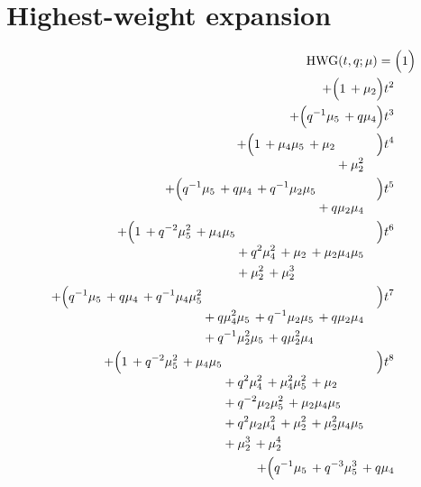 \documentclass[10pt]{article}
\begin{document}
\section{Highest-weight expansion}
\[
\begin{aligned}
\mathrm{HWG}(t,q;\mu) ={}&
   \Bigl(1\Bigr) \\
  + \Bigl(1\,+\mu_{2}\Bigr)t^{2} \\
  + \Bigl(q^{-1}\mu_{5}\,+q\mu_{4}\Bigr)t^{3} \\
  + \Bigl(\begin{aligned}[t]1\,+\mu_{4}\mu_{5}\,+\mu_{2} \\
  &{}+\mu_{2}^{2}\end{aligned}\Bigr)t^{4} \\
  + \Bigl(\begin{aligned}[t]q^{-1}\mu_{5}\,+q\mu_{4}\,+q^{-1}\mu_{2}\mu_{5} \\
  &{}+q\mu_{2}\mu_{4}\end{aligned}\Bigr)t^{5} \\
  + \Bigl(\begin{aligned}[t]1\,+q^{-2}\mu_{5}^{2}\,+\mu_{4}\mu_{5} \\
  &{}+q^{2}\mu_{4}^{2}\,+\mu_{2}\,+\mu_{2}\mu_{4}\mu_{5} \\
  &{}+\mu_{2}^{2}\,+\mu_{2}^{3}\end{aligned}\Bigr)t^{6} \\
  + \Bigl(\begin{aligned}[t]q^{-1}\mu_{5}\,+q\mu_{4}\,+q^{-1}\mu_{4}\mu_{5}^{2} \\
  &{}+q\mu_{4}^{2}\mu_{5}\,+q^{-1}\mu_{2}\mu_{5}\,+q\mu_{2}\mu_{4} \\
  &{}+q^{-1}\mu_{2}^{2}\mu_{5}\,+q\mu_{2}^{2}\mu_{4}\end{aligned}\Bigr)t^{7} \\
  + \Bigl(\begin{aligned}[t]1\,+q^{-2}\mu_{5}^{2}\,+\mu_{4}\mu_{5} \\
  &{}+q^{2}\mu_{4}^{2}\,+\mu_{4}^{2}\mu_{5}^{2}\,+\mu_{2} \\
  &{}+q^{-2}\mu_{2}\mu_{5}^{2}\,+\mu_{2}\mu_{4}\mu_{5} \\
  &{}+q^{2}\mu_{2}\mu_{4}^{2}\,+\mu_{2}^{2}\,+\mu_{2}^{2}\mu_{4}\mu_{5} \\
  &{}+\mu_{2}^{3}\,+\mu_{2}^{4}\end{aligned}\Bigr)t^{8} \\
  + \Bigl(\begin{aligned}[t]q^{-1}\mu_{5}\,+q^{-3}\mu_{5}^{3}\,+q\mu_{4} \\

\end{aligned}
\end{aligned}\]
\end{document}
